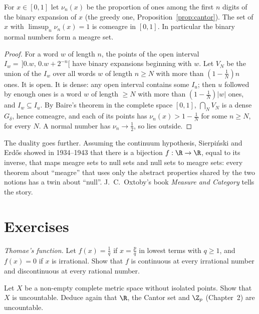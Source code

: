 \begin{proposition}\label{prop:nonnormal}
For $x\in[0,1]$ let $\nu_n(x)$ be the proportion of ones among the first $n$ digits of the binary expansion of $x$ (the greedy one, Proposition~\ref{prop:cantor}).
The set of $x$ with $\limsup_n\nu_n(x)=1$ is comeagre in $[0,1]$. In particular the binary normal numbers form a meagre set.
\end{proposition}
\begin{proof}
For a word $w$ of length $n$, the points of the open interval $I_w=\,]0.w,\,0.w+2^{-n}[$ have binary expansions beginning with $w$. Let $V_N$ be the union of the
$I_w$ over all words $w$ of length $n\ge N$ with more than $(1-\frac1N)n$ ones. It is open. It is dense: any open interval contains some $I_u$; then $u$ followed by
enough ones is a word $w$ of length $\ge N$ with more than $(1-\frac1N)|w|$ ones, and $I_w\subseteq I_u$. By Baire's theorem in the complete space $[0,1]$, $\bigcap_NV_N$ is a dense $G_\delta$,
hence comeagre, and each of its points has $\nu_n(x)>1-\frac1N$ for some $n\ge N$, for every $N$. A normal number has $\nu_n\to\frac12$, so lies outside.
\end{proof}

\begin{remark}
The duality goes further. Assuming the continuum hypothesis, Sierpi\'nski and Erd\H{o}s showed in 1934--1943 that there is a bijection $f:\R\to\R$, equal
to its inverse, that maps meagre sets to null sets and null sets to meagre sets: every theorem about ``meagre'' that uses only the
abstract properties shared by the two notions has a twin about ``null''. J.~C.~Oxtoby's book \emph{Measure and Category} tells the story.
\end{remark}

\section{Exercises}

\begin{exercise}[$\star$]\label{ex:thomae}
\emph{Thomae's function.} Let $f(x)=\frac1q$ if $x=\frac pq$ in lowest terms with $q\ge1$, and $f(x)=0$ if $x$ is irrational. Show that $f$ is continuous at every irrational number and
discontinuous at every rational number.
\end{exercise}

\begin{exercise}[$\star$]\label{ex:perfect}
Let $X$ be a non-empty complete metric space without isolated points. Show that $X$ is uncountable. Deduce again that $\R$, the Cantor set and $\Z_p$ (Chapter~2) are
uncountable.
\end{exercise}


